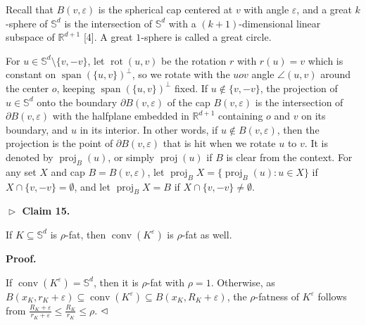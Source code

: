 \documentclass[10pt,a4paper]{amsart}
\begin{document}
\par
\par
Recall that $B(v,\varepsilon)$ is the spherical cap centered at $v$ with angle $\varepsilon$, and a great $k$-sphere of $\mathbb{S}^{d}$ is the intersection of $\mathbb{S}^{d}$ with a $(k+1)$-dimensional linear subspace of $\mathbb{R}^{d+1}$ [4]. A great $1$-sphere is called a great circle.
\par
\par
For $u\in\mathbb{S}^{d}\setminus\{v,-v\}$, let $\operatorname{rot}(u,v)$ be the rotation $r$ with $r(u)=v$ which is constant on $\operatorname{span}(\{u,v\})^{\perp}$, so we rotate with the $uov$ angle $\angle(u,v)$ around the center $o$, keeping $\operatorname{span}(\{u,v\})^{\perp}$ fixed. If $u\notin\{v,-v\}$, the projection of $u\in\mathbb{S}^{d}$ onto the boundary $\partial B(v,\varepsilon)$ of the cap $B(v,\varepsilon)$ is the intersection of $\partial B(v,\varepsilon)$ with the halfplane embedded in $\mathbb{R}^{d+1}$ containing $o$ and $v$ on its boundary, and $u$ in its interior. In other words, if $u\not\in B(v,\varepsilon)$, then the projection is the point of $\partial B(v,\varepsilon)$ that is hit when we rotate $u$ to $v$. It is denoted by $\operatorname{proj}_{B}(u)$, or simply $\operatorname{proj}(u)$ if $B$ is clear from the context. For any set $X$ and cap $B=B(v,\varepsilon)$, let $\operatorname{proj}_{B}X=\{\operatorname{proj}_{B}(u):u\in X\}$ if $X\cap\{v,-v\}=\emptyset$, and let $\operatorname{proj}_{B}X=B$ if $X\cap\{v,-v\}\neq\emptyset$.
\par
\par
\par\medskip\noindent\textbf{$\vartriangleright$ Claim 15.}\par
If $K\subseteq\mathbb{S}^{d}$ is $\rho$-fat, then $\operatorname{conv}(K^{\varepsilon})$ is $\rho$-fat as well.
\par
\par
\par
\par\medskip\noindent\textbf{Proof.}\par
If $\operatorname{conv}(K^{\varepsilon})=\mathbb{S}^{d}$, then it is $\rho$-fat with $\rho=1$. Otherwise, as $B(x_{K},r_{K}+\varepsilon)\subseteq\operatorname{conv}(K^{\varepsilon})%
\subseteq B(x_{K},R_{K}+\varepsilon)$, the $\rho$-fatness of $K^{\varepsilon}$ follows from $\frac{R_{K}+\varepsilon}{r_{K}+\varepsilon}\leq\frac{R_{K}}{r_{K}}\leq\rho$. $\hfill\vartriangleleft$
\end{document}
